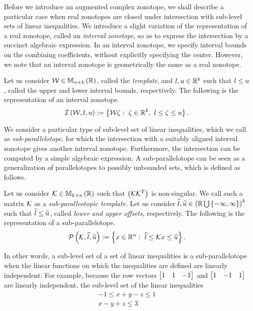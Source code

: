 Before we introduce an augmented complex zonotope, we shall describe a
particular case when real zonotopes are closed under intersection with
sub-level sets of linear inequalities.  We introduce a slight
variation of the representation of a real zonotope, called
an \emph{interval zonotope}, so as to express the intersection by a
succinct algebraic expression.  In an interval zonotope, we specify
interval bounds on the combining coefficients, without explicitly
specifying the center.  However, we note that an interval zonotope is
geometrically the same as a real zonotope.
%
\begin{definition}
Let us consider $\mathcal{W}\in\mathbb{M}_{n\times k}\left(\mathbb{R}\right)$, called the {\it
  template}, and $l,u\in\mathbb{R}^k$ such that $l\leq u$, called
  the upper and lower interval bounds, respectively.  The following is
  the representation of an interval zonotope.
%
\[
\mathit{\operatorname{\mathcal{I}}}\left(\mathcal{W},l,u\right):=\left\{\mathcal{W}\zeta:~\zeta\in\mathbb{R}^k,~l\leq\zeta\leq u\right\}.
\]
%
\end{definition}
%
We consider a particular type of sub-level set of linear
inequalities, which we call as \emph{sub-parallelotope}, for which the
intersection with a suitably aligned interval zonotope gives another
interval zonotope.  Furthermore, the intersection can be computed by a
simple algebraic expression.  A sub-parallelotope can be seen as a
generalization of parallelotopes to possibly unbounded sets, which is defined
as follows.
%
\begin{definition}
Let us consider ${\mathcal{K}}\in\mathbb{M}_{k\times n}\left(\mathbb{R}\right)$ such that
$\left(\mathcal{K}{\mathcal{K}}^T\right)$ is non-singular.  We
call such a matrix $\mathcal{K}$ as a \emph{sub-paralleotopic template}.  Let us
consider
$\widehat{l},\widehat{u}\in\left(\mathbb{R}\bigcup\left\{-\infty,\infty\right\}\right)^k$ such that $\widehat{l}\leq\widehat{u}$,
called {\it lower and upper offsets}, respectively.  The following is
the representation of a sub-parallelotope.
%
\[
\mathcal{P}\left(\mathcal{K},\widehat{l},\widehat{u}\right):=\left\{x\in\mathbb{R}^n:~\widehat{l}\leq\mathcal{K} x\leq\widehat{u}\right\}.
\]
%
\end{definition}
%
In other words, a sub-level set of a set of linear inequalities is a
sub-parallelotope when the linear functions on which the inequalities
are defined are linearly independent. For example, because the row
vectors $\left[\begin{matrix}1 & 1 & -1 \end{matrix}\right]$ and
$\left[\begin{matrix}1 & -1 & 1\end{matrix}\right]$ are linearly
independent, the sub-level set of
the linear inequalities
%
\begin{align*}
-1\leq x+y-z\leq 1\\
x-y+z\leq 3
\end{align*}
